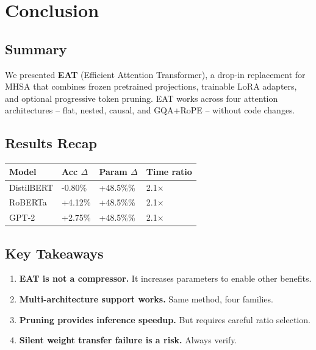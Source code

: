 
\section{Conclusion}

\subsection{Summary}

We presented \textbf{EAT} (Efficient Attention Transformer), a drop-in replacement 
for MHSA that combines frozen pretrained projections, trainable LoRA adapters, 
and optional progressive token pruning. EAT works across four attention 
architectures -- flat, nested, causal, and GQA+RoPE -- without code changes.

\subsection{Results Recap}

\begin{table}[H]
\centering
\small
\begin{tabular}{llll}
\toprule
\textbf{Model} & \textbf{Acc $\Delta$} & \textbf{Param $\Delta$} & \textbf{Time ratio} \\
\midrule
DistilBERT & -0.80\% & +48.5\%\% & 2.1$\times$ \\
RoBERTa & +4.12\% & +48.5\%\% & 2.1$\times$ \\
GPT-2 & +2.75\% & +48.5\%\% & 2.1$\times$ \\
\bottomrule
\end{tabular}
\end{table}

\subsection{Key Takeaways}

\begin{enumerate}
\item \textbf{EAT is not a compressor.} It increases parameters to enable other
  benefits.
\item \textbf{Multi-architecture support works.} Same method, four families.
\item \textbf{Pruning provides inference speedup.} But requires careful ratio
  selection.
\item \textbf{Silent weight transfer failure is a risk.} Always verify.

\end{enumerate}
